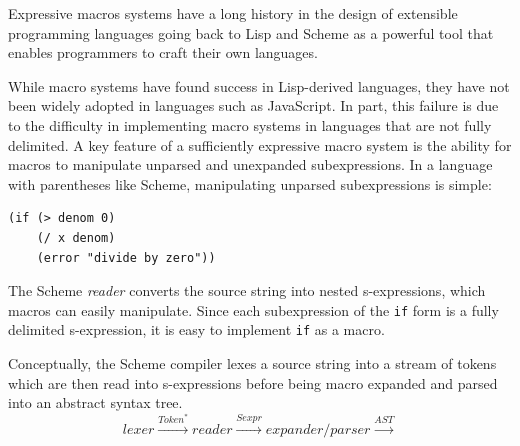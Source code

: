 \documentclass[preprint,10pt]{sigplanconf}
\begin{document}
Expressive macros systems have a long history in the design of
extensible programming languages going back to Lisp and Scheme
\cite{Kohlbecker1987,Foderaro1983} as a powerful tool that enables
programmers to craft their own languages.

While macro systems have found success in Lisp-derived languages,
they have not been widely adopted in languages such as JavaScript. In
part, this failure is due to the difficulty in implementing macro
systems in languages that are not fully delimited. A key feature of a
sufficiently expressive macro system is the ability for macros to
manipulate unparsed and unexpanded subexpressions. In a language with
parentheses like Scheme, manipulating unparsed subexpressions is
simple:
\begin{lstlisting}
(if (> denom 0)
    (/ x denom)
    (error "divide by zero"))
\end{lstlisting}
The Scheme \emph{reader} converts the source string into nested
s-expressions, which macros can easily manipulate. Since each
subexpression of the \verb!if! form is a fully delimited
s-expression, it is easy to implement \verb!if! as a
macro.


Conceptually, the Scheme compiler lexes a source string into
a stream of tokens which are then read into s-expressions
before being macro expanded and parsed into an abstract syntax tree.
\[
\textit{lexer} \xrightarrow{\textit{Token}^{*}}
\textit{reader} \xrightarrow{\textit{Sexpr}}
\textit{expander/parser} \xrightarrow{\textit{AST}}
\]
\end{document}
